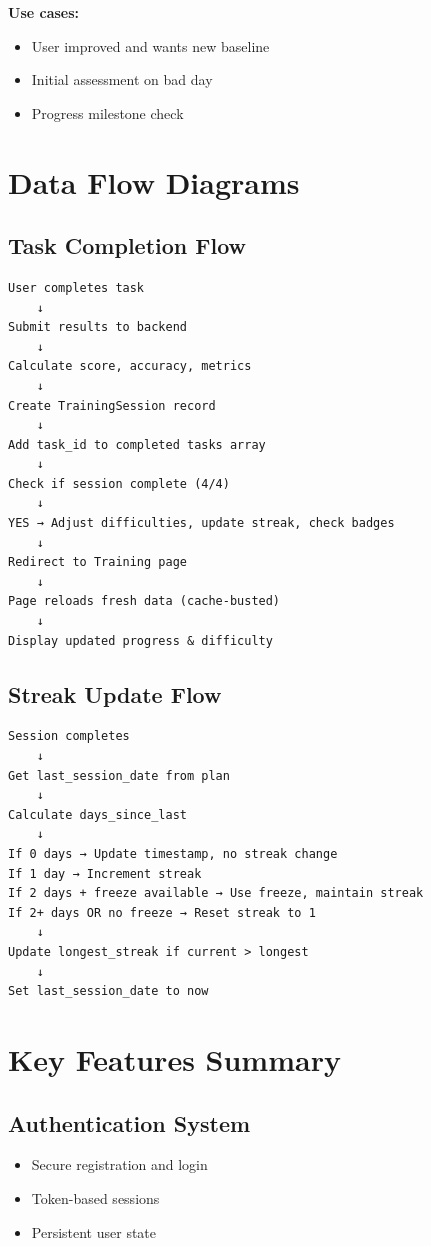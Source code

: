 \documentclass[12pt,a4paper]{article}
\begin{document}
\textbf{Use cases:}
\begin{itemize}
    \item User improved and wants new baseline
    \item Initial assessment on bad day
    \item Progress milestone check
\end{itemize}

\section{Data Flow Diagrams}

\subsection{Task Completion Flow}

\begin{verbatim}
User completes task
    ↓
Submit results to backend
    ↓
Calculate score, accuracy, metrics
    ↓
Create TrainingSession record
    ↓
Add task_id to completed tasks array
    ↓
Check if session complete (4/4)
    ↓
YES → Adjust difficulties, update streak, check badges
    ↓
Redirect to Training page
    ↓
Page reloads fresh data (cache-busted)
    ↓
Display updated progress & difficulty
\end{verbatim}

\subsection{Streak Update Flow}

\begin{verbatim}
Session completes
    ↓
Get last_session_date from plan
    ↓
Calculate days_since_last
    ↓
If 0 days → Update timestamp, no streak change
If 1 day → Increment streak
If 2 days + freeze available → Use freeze, maintain streak
If 2+ days OR no freeze → Reset streak to 1
    ↓
Update longest_streak if current > longest
    ↓
Set last_session_date to now
\end{verbatim}

\section{Key Features Summary}

\subsection{Authentication System}
\begin{itemize}
    \item Secure registration and login
    \item Token-based sessions
    \item Persistent user state
\end{itemize}
\end{document}
